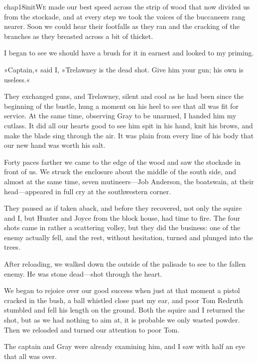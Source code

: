  
   \lettrine[lines=4,image=true]{chap18initW}{e} made our best speed across the strip of wood that now divided us from the stockade, and at every step we took the voices of the buccaneers rang nearer. Soon we could hear their footfalls as they ran and the cracking of the branches as they breasted across a bit of thicket.

I began to see we should have a brush for it in earnest and looked to my priming.

»Captain,« said I, »Trelawney is the dead shot. Give him your gun; his own is useless.«

They exchanged guns, and Trelawney, silent and cool as he had been since the beginning of the bustle, hung a moment on his heel to see that all was fit for service. At the same time, observing Gray to be unarmed, I handed him my cutlass. It did all our hearts good to see him spit in his hand, knit his brows, and make the blade sing through the air. It was plain from every line of his body that our new hand was worth his salt.

Forty paces farther we came to the edge of the wood and saw the stockade in front of us. We struck the enclosure about the middle of the south side, and almost at the same time, seven mutineers—Job Anderson, the boatswain, at their head—appeared in full cry at the southwestern corner.

They paused as if taken aback, and before they recovered, not only the squire and I, but Hunter and Joyce from the block house, had time to fire. The four shots came in rather a scattering volley, but they did the business: one of the enemy actually fell, and the rest, without hesitation, turned and plunged into the trees.

After reloading, we walked down the outside of the palisade to see to the fallen enemy. He was stone dead—shot through the heart.

We began to rejoice over our good success when just at that moment a pistol cracked in the bush, a ball whistled close past my ear, and poor Tom Redruth stumbled and fell his length on the ground. Both the squire and I returned the shot, but as we had nothing to aim at, it is probable we only wasted powder. Then we reloaded and turned our attention to poor Tom.

The captain and Gray were already examining him, and I saw with half an eye that all was over.

